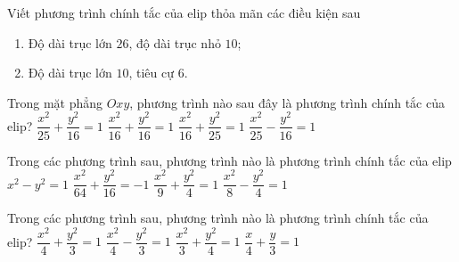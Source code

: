\begin{bt}%
	Viết phương trình chính tắc của elip thỏa mãn các điều kiện sau
	\begin{enumerate}
		\item Độ dài trục lớn $26$, độ dài trục nhỏ $10$;
		\item Độ dài trục lớn $10$, tiêu cự $6$.
	\end{enumerate}	
\end{bt}


\begin{ex}%
	Trong  mặt phẳng $O x y$, phương trình nào sau đây là phương trình chính tắc của elip?
	 \choice
		{\True$\dfrac{x^2}{25}+\dfrac{y^2}{16}=1$} 
		{$\dfrac{x^2}{16}+\dfrac{y^2}{16}=1$} 
		{$\dfrac{x^2}{16}+\dfrac{y^2}{25}=1$} 
		{$\dfrac{x^2}{25}-\dfrac{y^2}{16}=1$} 
\end{ex}

\begin{ex}%
	Trong các phương trình sau, phương trình nào là phương  trình chính tắc của elip
	 \choice
		 {$x^2-y^2=1$}
		 {$\dfrac{x^2}{64}+\dfrac{y^2}{16}=-1$}
		{\True $\dfrac{x^2}{9}+\dfrac{y^2}{4}=1$} 
		 {$\dfrac{x^2}{8}-\dfrac{y^2}{4}=1$}
\end{ex}

\begin{ex}%
	Trong  các phương trình sau, phương trình nào là phương trình chính tắc của elip?
	\choice 
		 {\True $\dfrac{x^2}{4}+\dfrac{y^2}{3}=1$}
		 {$\dfrac{x^2}{4}-\dfrac{y^2}{3}=1$}
		 {$\dfrac{x^2}{3}+\dfrac{y^2}{4}=1$}
		{$\dfrac{x}{4}+\dfrac{y}{3}=1$} 
\end{ex}

